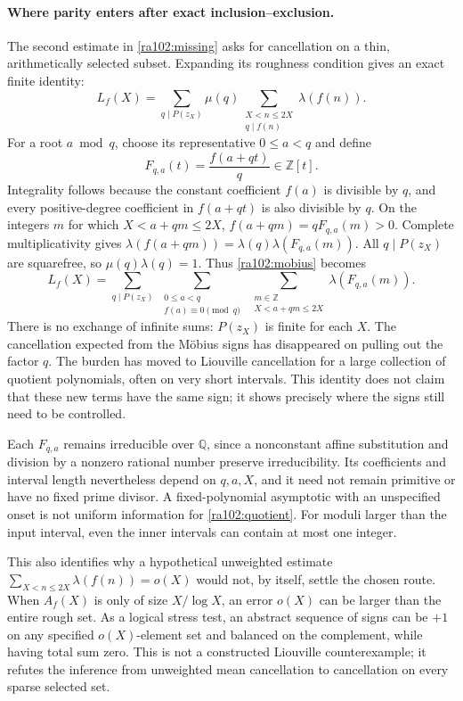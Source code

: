 \documentclass[11pt]{article}
\newcommand{\Z}{\mathbb{Z}}
\newcommand{\Q}{\mathbb{Q}}
\begin{document}
\paragraph{Where parity enters after exact inclusion--exclusion.}
The second estimate in \eqref{ra102:missing} asks for cancellation on a
thin, arithmetically selected subset. Expanding its roughness condition gives
an exact finite identity:
\begin{equation}\label{ra102:mobius}
 L_f(X)=\sum_{q\mid P(z_X)}\mu(q)
           \sum_{\substack{X<n\le2X\\q\mid f(n)}}\lambda(f(n)).
\end{equation}
For a root $a\bmod q$, choose its representative $0\le a<q$ and define
\[
 F_{q,a}(t)=\frac{f(a+qt)}q\in\Z[t].
\]
Integrality follows because the constant coefficient $f(a)$ is divisible by
$q$, and every positive-degree coefficient in $f(a+qt)$ is also divisible
by $q$. On the integers $m$ for which $X<a+qm\le2X$,
$f(a+qm)=qF_{q,a}(m)>0$. Complete multiplicativity gives
$\lambda(f(a+qm))=\lambda(q)\lambda(F_{q,a}(m))$.
All $q\mid P(z_X)$ are squarefree, so $\mu(q)\lambda(q)=1$.
Thus \eqref{ra102:mobius} becomes
\begin{equation}\label{ra102:quotient}
 L_f(X)=
 \sum_{q\mid P(z_X)}
 \ \sum_{\substack{0\le a<q\\ f(a)\equiv0\pmod q}}
 \ \sum_{\substack{m\in\Z\\X<a+qm\le2X}}
        \lambda(F_{q,a}(m)).
\end{equation}
There is no exchange of infinite sums: $P(z_X)$ is finite for each $X$.
The cancellation expected from the M\"obius signs has disappeared on pulling
out the factor $q$. The burden has moved to Liouville cancellation for a
large collection of quotient polynomials, often on very short intervals.
This identity does not claim that these new terms have the same sign; it
shows precisely where the signs still need to be controlled.

Each $F_{q,a}$ remains irreducible over $\Q$, since a nonconstant affine
substitution and division by a nonzero rational number preserve
irreducibility. Its coefficients and interval length nevertheless depend on
$q,a,X$, and it need not remain primitive or have no fixed prime divisor.
A fixed-polynomial asymptotic with an unspecified onset is not uniform
information for \eqref{ra102:quotient}. For moduli larger than the input
interval, even the inner intervals can contain at most one integer.

This also identifies why a hypothetical unweighted estimate
$\sum_{X<n\le2X}\lambda(f(n))=o(X)$ would not, by itself, settle the chosen
route. When $A_f(X)$ is only of size $X/\log X$, an error $o(X)$ can be larger
than the entire rough set. As a logical stress test, an abstract sequence of
signs can be $+1$ on any specified $o(X)$-element set and balanced on the
complement, while having total sum zero. This is not a constructed Liouville
counterexample; it refutes the inference from unweighted mean cancellation
to cancellation on every sparse selected set.
\end{document}
